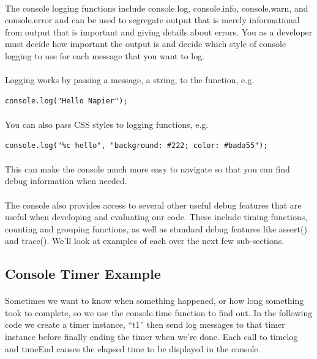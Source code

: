 \paragraph{} The console logging functions include console.log, console.info, console.warn, and console.error and can be used to segregate output that is merely informational from output that is important and giving details about errors. You as a developer must decide how important the output is and decide which style of console logging to use for each message that you want to log.
\paragraph{} Logging works by passing a message, a string, to the function, e.g.

\begin{lstlisting}
console.log("Hello Napier");
\end{lstlisting}

\paragraph{} You can also pass CSS styles to logging functions, e.g.

\begin{lstlisting}
console.log("%c hello", "background: #222; color: #bada55");
\end{lstlisting}

\paragraph{} This can make the console much more easy to navigate so that you can find debug information when needed.

\paragraph{} The console also provides access to several other useful debug features that are useful when developing and evaluating our code. These include timing functions, counting and grouping functions, as well as standard debug features like assert() and trace(). We'll look at examples of each over the next few sub-sections.



\subsection{Console Timer Example}
\paragraph{} Sometimes we want to know when something happened, or how long something took to complete, so we use the console.time function to find out. In the following code we create a timer instance, ``t1'' then send log messages to that timer instance before finally ending the timer when we're done. Each call to timelog and timeEnd causes the elapsed time to be displayed in the console.

